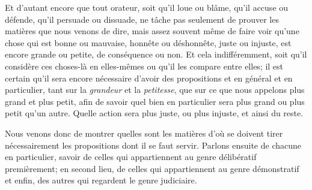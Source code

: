 \bigbreak

Et d'autant encore que tout orateur, soit qu'il loue ou blâme, qu'il accuse ou défende, qu'il persuade ou dissuade, ne tâche
pas seulement de prouver les matières que nous venons de dire, mais assez souvent même de faire voir qu'une chose qui est bonne
ou mauvaise, honnête ou déshonnête, juste ou injuste, est encore grande ou petite, de conséquence ou non. Et cela indifféremment,
soit qu'il considère ces choses-là en elles-mêmes ou qu'il les compare entre elles; il est certain qu'il sera encore nécessaire
d'avoir des propositions et en général et en particulier, tant sur la \emph{grandeur} et la \emph{petitesse}, que sur ce que nous
appelons plus grand et plus petit, afin de savoir quel bien en particulier sera plus grand ou plus petit qu'un autre. Quelle
action sera plus juste, ou plus injuste, et ainsi du reste. 

Nous venons donc de montrer quelles sont les matières d'où se doivent tirer nécessairement les propositions dont il se faut servir.
Parlons ensuite de chacune en particulier, savoir de celles qui appartiennent au genre délibératif premièrement; en second lieu,
de celles qui appartiennent au genre démonstratif et enfin, des autres qui regardent le genre judiciaire. 

